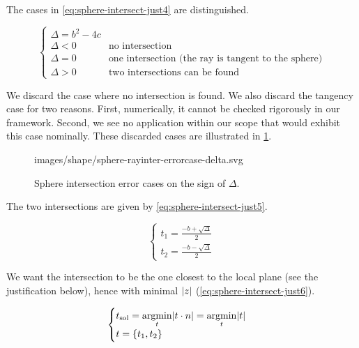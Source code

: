 The cases in \cref{eq:sphere-intersect-just4} are distinguished.

\begin{equation} \label{eq:sphere-intersect-just4} \begin{cases}
\Delta = b^2 - 4c & \\
\Delta < 0 & \text{no intersection} \\
\Delta = 0 & \text{one intersection (the ray is tangent to the sphere)} \\
\Delta > 0 & \text{two intersections can be found}
\end{cases} \end{equation}

We discard the case where no intersection is found. We also discard
the tangency case for two reasons. First, numerically, it cannot be checked
rigorously in our framework. Second, we see no application within our scope
that would exhibit this case nominally. These discarded cases are illustrated
in \cref{fig:sphere-inter-delta}.

\begin{figure} \caption{\label{fig:sphere-inter-delta} Sphere intersection
error cases on the sign of $\Delta$.}

           {images/shape/sphere-rayinter-errorcase-delta.svg}
\end{figure}

The two intersections are given by \cref{eq:sphere-intersect-just5}.

\begin{equation} \label{eq:sphere-intersect-just5} \begin{cases}
t_1 = \frac{-b + \sqrt{\Delta}}{2} \\
t_2 = \frac{-b - \sqrt{\Delta}}{2}
\end{cases} \end{equation}

We want the intersection to be the one closest to the local plane
(see the justification below), hence with minimal $\abs{z}$
(\cref{eq:sphere-intersect-just6}).

\begin{equation} \label{eq:sphere-intersect-just6} \begin{cases}
t_\textrm{sol} = \underset{t}{\mathrm{argmin}} \abs{t \cdot n} 
               = \underset{t}{\mathrm{argmin}} \abs{t} \\
t = \{ t_1, t_2 \}
\end{cases} \end{equation}

